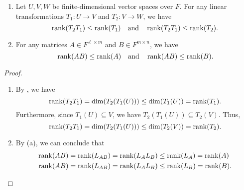 \begin{theorem}
  \label{thm:rank-decrease}
  \leavevmode
  \begin{enumerate}
    \item Let $U, V, W$ be finite-dimensional vector spaces over $F$.
    For any linear transformations $T_1: U \to V$ and $T_2: V \to W$, we have
    \begin{equation*}
      \operatorname{rank}(T_2T_1) \leq \operatorname{rank}(T_1)
      \quad \text{and} \quad
      \operatorname{rank}(T_2T_1) \leq \operatorname{rank}(T_2).
    \end{equation*}
    \item For any matrices $A \in F^{\ell \times m}$ and
    $B \in F^{m \times n}$, we have
    \begin{equation*}
      \operatorname{rank}(AB) \leq \operatorname{rank}(A)
      \quad \text{and} \quad
      \operatorname{rank}(AB) \leq \operatorname{rank}(B).
    \end{equation*}
  \end{enumerate}
\end{theorem}
\begin{proof}
  \leavevmode
  \begin{enumerate}
    \item By , we have
    \begin{equation*}
      \operatorname{rank}(T_2T_1)
      = \dim(T_2(T_1(U)))
      \leq \dim(T_1(U))
      = \operatorname{rank}(T_1).
    \end{equation*}
    Furthermore, since $T_1(U) \subseteq V$, we have
    $T_2(T_1(U)) \subseteq T_2(V)$.
    Thus,
    \begin{equation*}
      \operatorname{rank}(T_2T_1)
      = \dim(T_2(T_1(U)))
      \leq \dim(T_2(V))
      = \operatorname{rank}(T_2).
    \end{equation*}
    
    \item By (a), we can conclude that
    \begin{align*}
      \operatorname{rank}(AB) &= \operatorname{rank}(L_{AB}) = \operatorname{rank}(L_AL_B) \leq \operatorname{rank}(L_A) = \operatorname{rank}(A) \\
      \operatorname{rank}(AB) &= \operatorname{rank}(L_{AB}) = \operatorname{rank}(L_AL_B) \leq \operatorname{rank}(L_B) = \operatorname{rank}(B).
      \qedhere
    \end{align*}
  \end{enumerate}
\end{proof}

